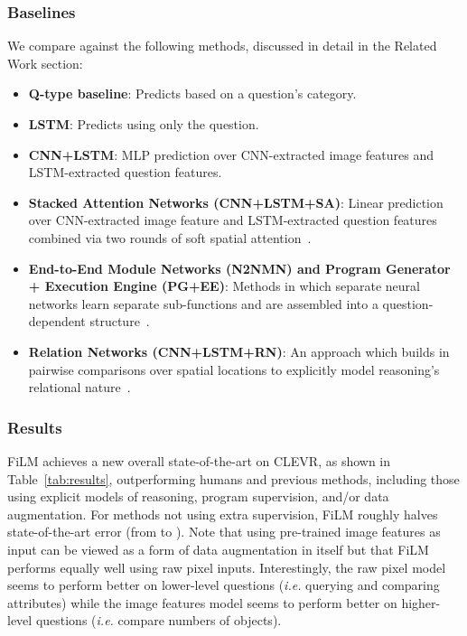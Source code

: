 \documentclass[letterpaper]{article} \usepackage{aaai18}  \usepackage{times}  \usepackage{helvet}  \usepackage{courier}  \usepackage{url}  \usepackage{graphicx}  \frenchspacing  \setlength{\pdfpagewidth}{8.5in}  \setlength{\pdfpageheight}{11in}
\begin{document}
    \subsubsection{Baselines} \label{baselines}
    	We compare against the following methods, discussed in detail in the Related Work section:
        \begin{itemize}
        	\item \textbf{Q-type baseline}: Predicts based on a question's category.
            \item \textbf{LSTM}: Predicts using only the question. 
            \item \textbf{CNN+LSTM}: MLP prediction over CNN-extracted image features and LSTM-extracted question features.
        	\item \textbf{Stacked Attention Networks (CNN+LSTM+SA)}: Linear prediction over CNN-extracted image feature and LSTM-extracted question features combined via two rounds of soft spatial attention~\cite{SANs}.
             \item \textbf{End-to-End Module Networks (N2NMN) and Program Generator + Execution Engine (PG+EE)}: Methods in which separate neural networks learn separate sub-functions and are assembled into a question-dependent structure~\cite{N2NMN,IEP}.
             \item \textbf{Relation Networks (CNN+LSTM+RN)}: An approach which builds in pairwise comparisons over spatial locations to explicitly model reasoning's relational nature~\cite{RN}.
        \end{itemize}

	\subsubsection{Results} \label{results}

		FiLM achieves a new overall state-of-the-art on CLEVR, as shown in Table~\ref{tab:results}, outperforming humans and previous methods, including those using explicit models of reasoning, program supervision, and/or data augmentation. For methods not using extra supervision, FiLM roughly halves state-of-the-art error (from  to ). Note that using pre-trained image features as input can be viewed as a form of data augmentation in itself but that FiLM performs equally well using raw pixel inputs. Interestingly, the raw pixel model seems to perform better on lower-level questions (\textit{i.e.} querying and comparing attributes) while the image features model seems to perform better on higher-level questions (\textit{i.e.} compare numbers of objects).
\end{document}

